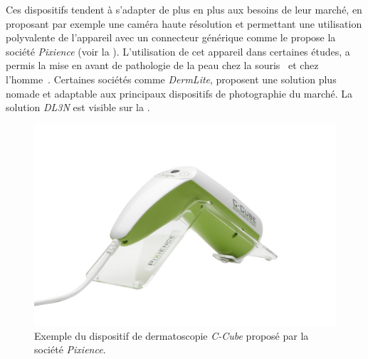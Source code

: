 Ces dispositifs tendent à s'adapter de plus en plus aux besoins de leur marché, en proposant par exemple une caméra haute résolution et permettant une utilisation polyvalente de l'appareil avec un connecteur générique comme le propose la société \textit{Pixience} (voir la ). L'utilisation de cet appareil dans certaines études, a permis la mise en avant de pathologie de la peau chez la souris~\cite{Pillon2017} et chez l'homme~\cite{Cinotti2016}. Certaines sociétés comme \textit{DermLite}, proposent une solution plus nomade et adaptable aux principaux dispositifs de photographie du marché. La solution \textit{DL3N} est visible sur la .\par

\begin{figure}[H]
    \centering
    \includegraphics[width=0.75\linewidth]{contents/chapter_2/resources/example_device_ccube.jpg}
    \caption{Exemple du dispositif de dermatoscopie \textit{C-Cube} proposé par la société \textit{Pixience}.}
    \label{fig:example_device_ccube}
\end{figure}\par

